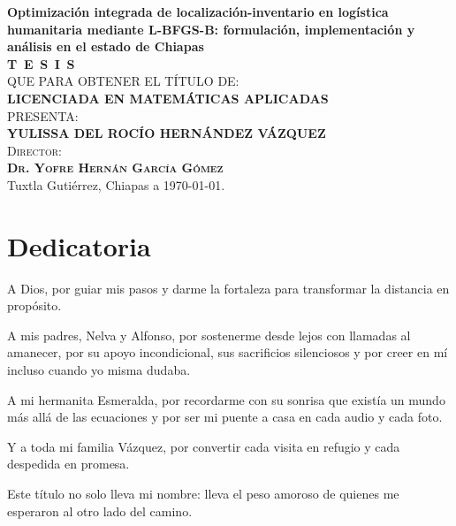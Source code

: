 \begin{titlepage}
\begin{minipage}[t][0.95\textheight][c]{0.76\textwidth}
            \begin{center}
                {\Large\bfseries Optimización integrada de localización-inventario en logística humanitaria mediante L-BFGS-B: formulación, implementación y análisis en el estado de Chiapas}\\[2cm]
                \textsc{\huge \textbf{T\, E\, S\, I\, S}}\\[1.5cm]
                \textsc{\large QUE PARA OBTENER EL TÍTULO DE:}\\[0.3cm]
                \textbf{\textsc{LICENCIADA EN MATEMÁTICAS APLICADAS}}\\[1.5cm]
                \textsc{\large PRESENTA:}\\[0.3cm]
                \textbf{\textsc{\large {YULISSA DEL ROCÍO HERNÁNDEZ VÁZQUEZ}}}\\[2cm]
                {\large\scshape Director:\\[0.3cm]
                {\textbf{\large Dr. Yofre Hernán García Gómez }}}\\[2.0cm]
                \large{Tuxtla Gutiérrez, Chiapas a \today.}

            \end{center}
\end{minipage}
\end{titlepage}

\pagebreak[2]

\chapter*{Dedicatoria}
\begin{center}
\itshape
\setlength{\parindent}{0pt} %
\setlength{\parskip}{1.2\baselineskip} %

A Dios, por guiar mis pasos y darme la fortaleza para transformar la distancia en propósito.

A mis padres, Nelva y Alfonso, por sostenerme desde lejos con llamadas al amanecer, por su apoyo incondicional, sus sacrificios silenciosos y por creer en mí incluso cuando yo misma dudaba.

A mi hermanita Esmeralda, por recordarme con su sonrisa que existía un mundo más allá de las ecuaciones y por ser mi puente a casa en cada audio y cada foto.

Y a toda mi familia Vázquez, por convertir cada visita en refugio y cada despedida en promesa.

Este título no solo lleva mi nombre: lleva el peso amoroso de quienes me esperaron al otro lado del camino.
\end{center}



